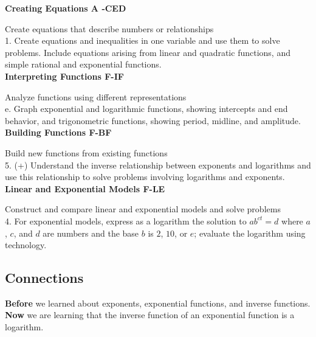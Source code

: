 \documentclass[12pt]{article}
\begin{document}
\textbf{Creating Equations \hfill A -CED} 

Create equations that describe numbers or relationships\\

1. Create equations and inequalities in one variable and use them to solve problems. Include equations arising from linear and quadratic functions, and simple rational and exponential functions.\\

\textbf{Interpreting Functions \hfill	F-IF}

Analyze functions using different representations\\

e.	 Graph exponential and logarithmic functions, showing intercepts
and end behavior, and trigonometric functions, showing period,
midline, and amplitude.\\

\textbf{Building Functions 	\hfill F-BF}

Build new functions from existing functions\\

5. (+) Understand the inverse relationship between exponents and
logarithms and use this relationship to solve problems involving
logarithms and exponents.\\

\textbf{Linear and Exponential Models \hfill	F-LE}

Construct and compare linear and exponential models and solve
problems\\

4.	 For exponential models, express as a logarithm the solution to 	
$ab^{ct} = d$ where $a$, $c$, and $d$ are numbers and the base $b$ is $2$, $10$, or $e$;
evaluate the logarithm using technology.\\

\subsection{Connections}

\textbf{Before} we learned about exponents, exponential functions, and inverse functions. \\

\textbf{Now} we are learning that the inverse function of an exponential function is a logarithm.\\

\let\stdsection\section
\renewcommand\section{\newpage\stdsection}
\end{document}
